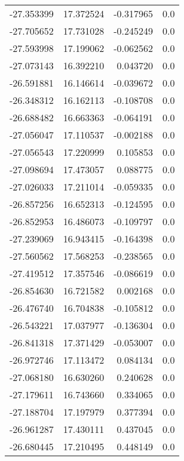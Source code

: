 \begin{tabular}{rrrr}
      -27.353399 &        17.372524 &   -0.317965 &   0.0 \\
      -27.705652 &        17.731028 &   -0.245249 &   0.0 \\
      -27.593998 &        17.199062 &   -0.062562 &   0.0 \\
      -27.073143 &        16.392210 &    0.043720 &   0.0 \\
      -26.591881 &        16.146614 &   -0.039672 &   0.0 \\
      -26.348312 &        16.162113 &   -0.108708 &   0.0 \\
      -26.688482 &        16.663363 &   -0.064191 &   0.0 \\
      -27.056047 &        17.110537 &   -0.002188 &   0.0 \\
      -27.056543 &        17.220999 &    0.105853 &   0.0 \\
      -27.098694 &        17.473057 &    0.088775 &   0.0 \\
      -27.026033 &        17.211014 &   -0.059335 &   0.0 \\
      -26.857256 &        16.652313 &   -0.124595 &   0.0 \\
      -26.852953 &        16.486073 &   -0.109797 &   0.0 \\
      -27.239069 &        16.943415 &   -0.164398 &   0.0 \\
      -27.560562 &        17.568253 &   -0.238565 &   0.0 \\
      -27.419512 &        17.357546 &   -0.086619 &   0.0 \\
      -26.854630 &        16.721582 &    0.002168 &   0.0 \\
      -26.476740 &        16.704838 &   -0.105812 &   0.0 \\
      -26.543221 &        17.037977 &   -0.136304 &   0.0 \\
      -26.841318 &        17.371429 &   -0.053007 &   0.0 \\
      -26.972746 &        17.113472 &    0.084134 &   0.0 \\
      -27.068180 &        16.630260 &    0.240628 &   0.0 \\
      -27.179611 &        16.743660 &    0.334065 &   0.0 \\
      -27.188704 &        17.197979 &    0.377394 &   0.0 \\
      -26.961287 &        17.430111 &    0.437045 &   0.0 \\
      -26.680445 &        17.210495 &    0.448149 &   0.0 \\

\end{tabular}
